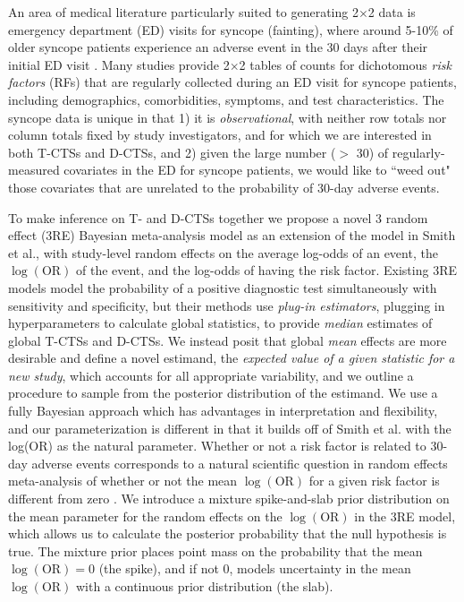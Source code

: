 \documentclass[AMA,STIX1COL]{WileyNJD-v2}
\begin{document}
An area of medical literature particularly suited to generating 2$\times$2 data is emergency department (ED) visits for syncope (fainting), where around 5-10\% of older syncope patients experience an adverse event in the 30 days after their initial ED visit \cite{gibson2018}. Many studies provide 2$\times$2 tables of counts for dichotomous \textit{risk factors} (RFs) that are regularly collected during an ED visit for syncope patients, including demographics, comorbidities, symptoms, and test characteristics. The syncope data is unique in that 1) it is \textit{observational}, with neither row totals nor column totals fixed by study investigators, and for which we are interested in both T-CTSs and D-CTSs, and 2) given the large number ($>$ 30) of regularly-measured covariates in the ED for syncope patients, we would like to ``weed out" those covariates that are unrelated to the probability of 30-day adverse events. 

To make inference on T- and D-CTSs together we propose a novel 3 random effect (3RE) Bayesian meta-analysis model as an extension of the model in Smith et al.\cite{smith1995}, with study-level random effects on the average log-odds of an event, the $\log(\mbox{OR})$ of the event, and the log-odds of having the risk factor. Existing 3RE models \cite{chu2009, ma2018network, wynants2018trivariate} model the probability of a positive diagnostic test simultaneously with sensitivity and specificity, but their methods use \textit{plug-in estimators}, plugging in hyperparameters to calculate global statistics, to provide \textit{median} estimates of global T-CTSs and D-CTSs. We instead posit that global \textit{mean} effects are more desirable and define a novel estimand, the \textit{expected value of a given statistic for a new study}, which accounts for all appropriate variability, and we outline a procedure to sample from the posterior distribution of the estimand. We use a fully Bayesian approach which has advantages in interpretation and flexibility, and our parameterization is different in that it builds off of Smith et al.\cite{smith1995} with the log(OR) as the natural parameter. Whether or not a risk factor is related to 30-day adverse events corresponds to a natural scientific question in random effects meta-analysis of whether or not the mean $\log(\mbox{OR})$ for a given risk factor is different from zero \cite{higgins2009}. We introduce a mixture spike-and-slab prior distribution \cite{GM1993, GM1997, KM1998, ishwaran2005} on the mean parameter for the random effects on the $\log(\mbox{OR})$ in the 3RE model, which allows us to calculate the posterior probability that the null hypothesis is true. The mixture prior places point mass on the probability that the mean $\log(\mbox{OR}) = 0$ (the spike), and if not 0, models uncertainty in the mean $\log(\mbox{OR})$ with a continuous prior distribution (the slab). 
\end{document}

